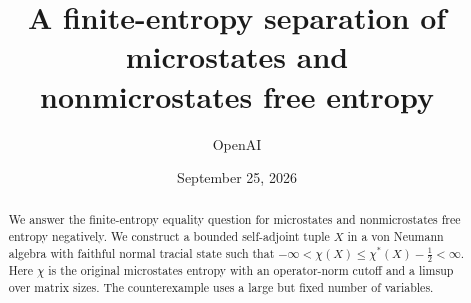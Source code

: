 \documentclass[11pt]{article}
\title{A finite-entropy separation of microstates and\\nonmicrostates free entropy}
\author{OpenAI}
\date{September 25, 2026}
\begin{document}
\maketitle
\begin{abstract}
We answer the finite-entropy equality question for microstates and
nonmicrostates free entropy negatively. We construct a bounded self-adjoint
tuple $X$ in a von Neumann algebra with faithful normal tracial state such that
$-\infty<\chi(X)\leq\chi^*(X)-\tfrac12<\infty$.
Here $\chi$ is the original microstates entropy with an operator-norm
cutoff and a limsup over matrix sizes. The counterexample uses a large but
fixed number of variables.
\end{abstract}








\end{document}
